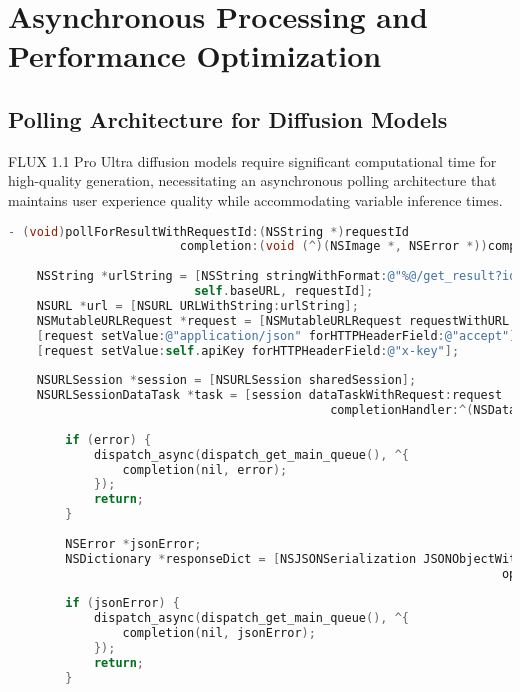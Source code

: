 \section{Asynchronous Processing and Performance Optimization}

\subsection{Polling Architecture for Diffusion Models}

FLUX 1.1 Pro Ultra diffusion models require significant computational time for high-quality generation, necessitating an asynchronous polling architecture that maintains user experience quality while accommodating variable inference times.

\begin{lstlisting}[language=C,basicstyle=\footnotesize\ttfamily,frame=single,breaklines=true,columns=flexible,caption={Asynchronous Polling Implementation},label={lst:polling_implementation}]
- (void)pollForResultWithRequestId:(NSString *)requestId
                        completion:(void (^)(NSImage *, NSError *))completion {
    
    NSString *urlString = [NSString stringWithFormat:@"%@/get_result?id=%@", 
                          self.baseURL, requestId];
    NSURL *url = [NSURL URLWithString:urlString];
    NSMutableURLRequest *request = [NSMutableURLRequest requestWithURL:url];
    [request setValue:@"application/json" forHTTPHeaderField:@"accept"];
    [request setValue:self.apiKey forHTTPHeaderField:@"x-key"];
    
    NSURLSession *session = [NSURLSession sharedSession];
    NSURLSessionDataTask *task = [session dataTaskWithRequest:request 
                                             completionHandler:^(NSData *data, NSURLResponse *response, NSError *error) {
        
        if (error) {
            dispatch_async(dispatch_get_main_queue(), ^{
                completion(nil, error);
            });
            return;
        }
        
        NSError *jsonError;
        NSDictionary *responseDict = [NSJSONSerialization JSONObjectWithData:data 
                                                                     options:0 
                                                                       error:&jsonError];
        if (jsonError) {
            dispatch_async(dispatch_get_main_queue(), ^{
                completion(nil, jsonError);
            });
            return;
        }
        

\end{lstlisting}
